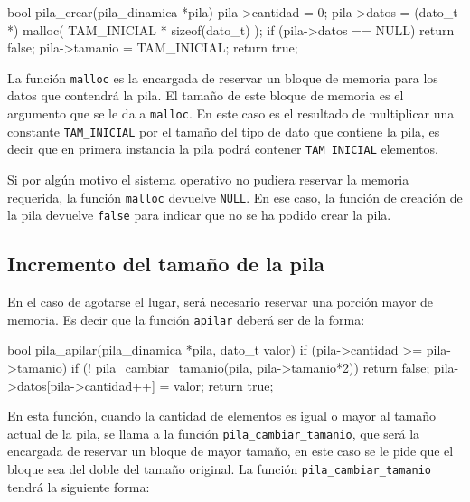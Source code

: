 \begin{codigo-c-plano}
bool pila_crear(pila_dinamica *pila) 
{
	pila->cantidad = 0;
	pila->datos = (dato_t *) malloc( TAM_INICIAL * sizeof(dato_t) );
	if (pila->datos == NULL) return false;
	pila->tamanio = TAM_INICIAL;
	return true;
}
\end{codigo-c-plano}

La función \lstinline!malloc! es la encargada de reservar un bloque de memoria
para los datos que contendrá la pila.  El tamaño de este bloque de memoria es
el argumento que se le da a \lstinline!malloc!.  En este caso es el resultado
de multiplicar una constante \lstinline!TAM_INICIAL! por el tamaño del tipo de
dato que contiene la pila, es decir que en primera instancia la pila podrá
contener \lstinline!TAM_INICIAL! elementos.


Si por algún motivo el sistema operativo no pudiera reservar la memoria
requerida, la función \lstinline!malloc! devuelve \lstinline!NULL!. En ese
caso, la función de creación de la pila devuelve \lstinline!false! para
indicar que no se ha podido crear la pila.

\subsection{Incremento del tamaño de la pila}

En el caso de agotarse el lugar, será necesario reservar una porción mayor de
memoria.  Es decir que la función \lstinline!apilar! deberá ser de la forma:

\begin{codigo-c-plano}
bool pila_apilar(pila_dinamica *pila, dato_t valor)
{
    if (pila->cantidad >= pila->tamanio) {
        if (! pila_cambiar_tamanio(pila, pila->tamanio*2)) return false;
    }
    pila->datos[pila->cantidad++] = valor;
    return true;
}
\end{codigo-c-plano}

En esta función, cuando la cantidad de elementos es igual o mayor al tamaño
actual de la pila, se llama a la función \lstinline!pila_cambiar_tamanio!, que
será la encargada de reservar un bloque de mayor tamaño, en este caso se le
pide que el bloque sea del doble del tamaño original. La función
\lstinline!pila_cambiar_tamanio! tendrá la siguiente forma:

